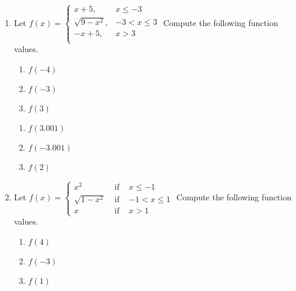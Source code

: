 \begin{enumerate}
\setcounter{enumi}{\value{HW}}

\item  Let $f(x) = \left\{  \begin{array}{rr} x + 5, & x \leq -3 \\ \sqrt{9-x^2}, & -3 < x \leq 3 \\ -x+5, & x > 3 \\ \end{array}        \right.$ Compute the following function values.

\begin{multicols}{3}
\begin{enumerate}

\item $f(-4)$
\item  $f(-3)$
\item  $f(3)$

\setcounter{HWindent}{\value{enumii}}
\end{enumerate}
\end{multicols}

\begin{multicols}{3}
\begin{enumerate}
\setcounter{enumii}{\value{HWindent}}

\item  $f(3.001)$
\item  $f(-3.001)$
\item  $f(2)$

\setcounter{HWindent}{\value{enumii}}
\end{enumerate}
\end{multicols}

\newpage

\item Let ${\displaystyle f(x) = \left\{ \begin{array}{rcl}
x^{2} & \mbox{ if } & x \leq -1\\
\sqrt{1 - x^{2}} & \mbox{ if } & -1 < x \leq 1\\
x & \mbox{ if } & x > 1  \end{array} \right. }$  Compute the following function values.

\begin{multicols}{3}
\begin{enumerate}

\item $f(4)$
\item $f(-3)$
\item $f(1)$


\end{enumerate}
\end{multicols}
\end{enumerate}
